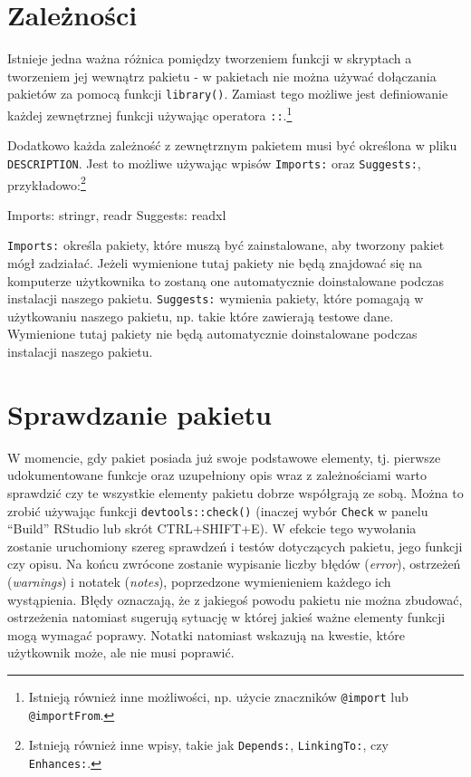 \documentclass[paper=6in:9in,pagesize=pdftex,headinclude=on,footinclude=on,10pt]{scrbook}
\newenvironment{Shaded}{\begin{snugshade}}{\end{snugshade}}
\newcommand{\FunctionTok}[1]{\textcolor[rgb]{0.00,0.00,0.00}{#1}}
\newcommand{\NormalTok}[1]{#1}
\begin{document}
\hypertarget{zaleux17cnoux15bci}{%
\section{Zależności}\label{zaleux17cnoux15bci}}

Istnieje jedna ważna różnica pomiędzy tworzeniem funkcji w skryptach a tworzeniem jej wewnątrz pakietu - w pakietach nie można używać dołączania pakietów za pomocą funkcji \texttt{library()}.
Zamiast tego możliwe jest definiowanie każdej zewnętrznej funkcji używając operatora \texttt{::}.\footnote{Istnieją również inne możliwości, np. użycie znaczników \texttt{@import} lub \texttt{@importFrom}.}

Dodatkowo każda zależność z zewnętrznym pakietem musi być określona w pliku \texttt{DESCRIPTION}.
Jest to możliwe używając wpisów \texttt{Imports:} oraz \texttt{Suggests:}, przykładowo:\footnote{Istnieją również inne wpisy, takie jak \texttt{Depends:}, \texttt{LinkingTo:}, czy \texttt{Enhances:}.}

\begin{Shaded}
\begin{Highlighting}[]
\FunctionTok{Imports:}
\NormalTok{  stringr,}
\NormalTok{  readr}
\FunctionTok{Suggests:}
\NormalTok{  readxl}
\end{Highlighting}
\end{Shaded}

\texttt{Imports:} określa pakiety, które muszą być zainstalowane, aby tworzony pakiet mógł zadziałać.
Jeżeli wymienione tutaj pakiety nie będą znajdować się na komputerze użytkownika to zostaną one automatycznie doinstalowane podczas instalacji naszego pakietu.
\texttt{Suggests:} wymienia pakiety, które pomagają w użytkowaniu naszego pakietu, np. takie które zawierają testowe dane.
Wymienione tutaj pakiety nie będą automatycznie doinstalowane podczas instalacji naszego pakietu.

\hypertarget{sprawdzanie-pakietu}{%
\section{Sprawdzanie pakietu}\label{sprawdzanie-pakietu}}

W momencie, gdy pakiet posiada już swoje podstawowe elementy, tj. pierwsze udokumentowane funkcje oraz uzupełniony opis wraz z zależnościami warto sprawdzić czy te wszystkie elementy pakietu dobrze współgrają ze sobą.
Można to zrobić używając funkcji \texttt{devtools::check()} (inaczej wybór \texttt{Check} w panelu ``Build'' RStudio lub skrót CTRL+SHIFT+E).
W efekcie tego wywołania zostanie uruchomiony szereg sprawdzeń i testów dotyczących pakietu, jego funkcji czy opisu.
Na końcu zwrócone zostanie wypisanie liczby błędów (\emph{error}), ostrzeżeń (\emph{warnings}) i notatek (\emph{notes}), poprzedzone wymienieniem każdego ich wystąpienia.
Błędy oznaczają, że z jakiegoś powodu pakietu nie można zbudować, ostrzeżenia natomiast sugerują sytuację w której jakieś ważne elementy funkcji mogą wymagać poprawy.
Notatki natomiast wskazują na kwestie, które użytkownik może, ale nie musi poprawić.
\end{document}
